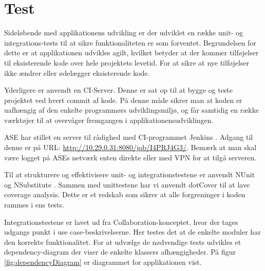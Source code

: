 \chapter{Test}
Sideløbende med applikationens udvikling er der udviklet en række unit- og integrations-tests til at sikre funktionaliteten er som forventet. Begrundelsen for dette er at applikationen udvikles agilt, hvilket betyder at der kommer tilføjelser til eksisterende kode over hele projektets levetid. For at sikre at nye tilføjelser ikke ændrer eller ødelægger eksisterende kode.

Yderligere er anvendt en CI-Server. Denne er sat op til at bygge og teste projektet ved hvert commit af kode. På denne måde sikrer man at koden er uafhængig af den enkelte programmørs udviklingsmiljø, og får samtidig en række værktøjer til at overvåger fremgangen i applikationensudviklingen.

ASE har stillet en server til rådighed med CI-programmet Jenkins \citep{jenkinsWeb}. Adgang til denne er på URL: \url{http://10.29.0.31:8080/job/I4PRJ4G3/}. Bemærk at man skal være logget på ASEs netværk enten direkte eller med VPN for at tilgå serveren.

Til at strukturere og effektivisere unit- og integrationstestene er anvendt NUnit \citep{nunitWeb} og NSubstitute \citep{nsubstituteWeb}. Sammen med unittestene har vi anvendt dotCover \citep{dotCoverWeb} til at lave coverage analysis. Dette er et redskab som sikrer at alle forgreninger i koden rammes i ens tests.

Integrationstestene er lavet ud fra Collaboration-konceptet, hvor der tages udgangs punkt i use case-beskrivelserne. Her testes det at de enkelte moduler har den korrekte funktionalitet.
For at udvælge de nødvendige tests udvikles et dependency-diagram der viser de enkelte klassers afhængigheder. På figur \ref{fig:dependencyDiagram} er diagrammet for applikationen vist.

